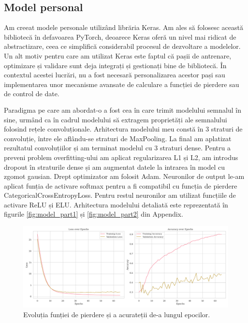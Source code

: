 \subsection{Model personal}
Am creeat modele personale utilizând librăria Keras\cite{keras}. Am ales să folosesc această bibliotecă în defavoarea PyTorch, deoarece Keras oferă un nivel mai ridicat de abstractizare, ceea ce simplifică considerabil procesul de dezvoltare a modelelor. Un alt motiv pentru care am utilizat Keras este faptul că pașii de antrenare, optimizare și validare sunt deja integrați și gestionați bine de bibliotecă. În contextul acestei lucrări, nu a fost necesară personalizarea acestor pași sau implementarea unor mecanisme avansate de calculare a funcției de pierdere sau de control de date. 

Paradigma pe care am abordat-o a fost cea în care trimit modelului semnalul în sine, urmând ca în cadrul modelului să extragem proprietăți ale semnalului folosind rețele convoluționale. Arhitectura modelului meu constă în 3 straturi de convoluție, între ele aflându-se straturi de MaxPooling. La final am aplatizat rezultatul convoluțiilor și am terminat modelul cu 3 straturi dense. Pentru a preveni problem overfitting-ului am aplicat regularizarea L1 și L2, am introdus dropout în straturile dense și am augmentat datele la intrarea în model cu zgomot gausian. Drept optimizator am folosit Adam. Neuronilor de output le-am aplicat funția de activare softmax pentru a fi compatibil cu funcția de pierdere CategoricalCrossEntropyLoss. Pentru restul neuronilor am utilizat funcțiile de activare ReLU și ELU. Arhitectura modelului detaliată este reprezentată în figurile \ref{fig:model_part1} și \ref{fig:model_part2} din Appendix.

\begin{figure}[H]
    \centering
		\vspace{-1em}
    \includegraphics[width=1\linewidth]{images/comparison_fold7.png}
    \caption{Evoluția funției de pierdere și a acurateții de-a lungul epocilor.}
		\vspace{-1em}
    \label{fig:model_train}
\end{figure}

